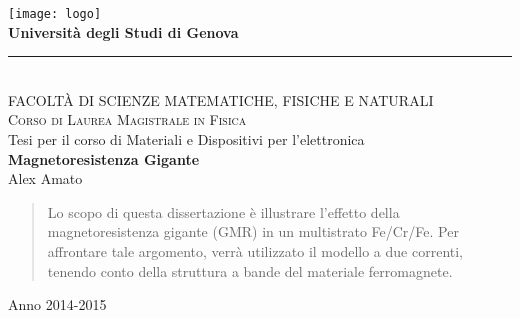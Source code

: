 \begin{titlepage}
\begin{center}
\texttt{[image: logo]}\\
\Large{\textbf{Università degli Studi di Genova}}\\
\rule{12cm}{0.5pt}\\
\large 
FACOLTÀ DI SCIENZE MATEMATICHE, FISICHE E NATURALI\\
\textsc{Corso di Laurea Magistrale in Fisica\\}
\vspace{1cm}
\normalsize
Tesi per il corso di Materiali e Dispositivi per l'elettronica\\

\vspace{1.5cm}
\huge{\textbf{Magnetoresistenza Gigante}}\\
\vspace{0.5cm}
\large
Alex Amato 
\vspace{3cm}
\begin{abstract}
Lo scopo di questa dissertazione è illustrare l'effetto della magnetoresistenza gigante (GMR) in un multistrato Fe/Cr/Fe. Per affrontare tale argomento, verrà utilizzato il modello a due correnti, tenendo conto della struttura a bande del materiale ferromagnete.
\end{abstract}



\vspace{7cm}
Anno 2014-2015\\
\end{center}
\end{titlepage}